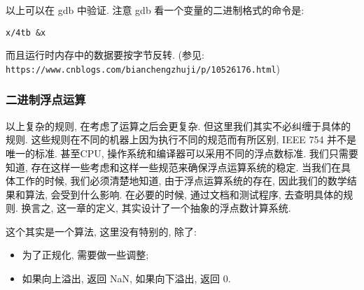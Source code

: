 \documentclass[a4paper]{ctexart}
\begin{document}
以上可以在 gdb 中验证. 注意 gdb 看一个变量的二进制格式的命令是:
\begin{verbatim}
x/4tb &x
\end{verbatim}
而且运行时内存中的数据要按字节反转.
(参见: \newline
\verb|https://www.cnblogs.com/bianchengzhuji/p/10526176.html|)

\subsubsection{二进制浮点运算}
以上复杂的规则, 在考虑了运算之后会更复杂. 但这里我们其实不必纠缠于具体的规则.
这些规则在不同的机器上因为执行不同的规范而有所区别, IEEE 754 并不是唯一的标准.
甚至CPU, 操作系统和编译器可以采用不同的浮点数标准. 
我们只需要知道, 存在这样一些考虑和这样一些规范来确保浮点运算系统的稳定.
当我们在具体工作的时候, 我们必须清楚地知道, 由于浮点运算系统的存在,
因此我们的数学结果和算法, 会受到什么影响. 在必要的时候, 通过文档和测试程序,
去查明具体的规则. 换言之, 这一章的定义, 其实设计了一个抽象的浮点数计算系统.



 这个其实是一个算法, 
这里没有特别的, 除了:
\begin{itemize}
\item 为了正规化, 需要做一些调整;
\item 如果向上溢出, 返回 NaN, 如果向下溢出, 返回 $0$.
\end{itemize}
\end{document}
